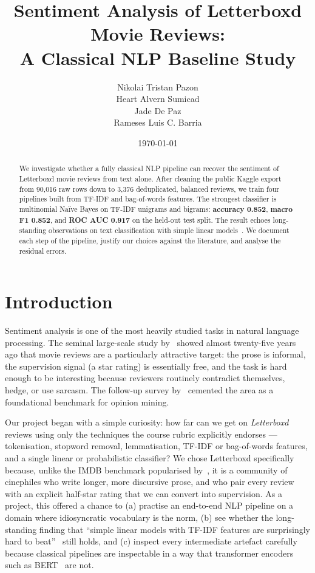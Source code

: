 \documentclass[11pt]{article}
\title{Sentiment Analysis of Letterboxd Movie Reviews:\\
A Classical NLP Baseline Study}
\author{Nikolai Tristan Pazon\\Heart Alvern Sumicad\\Jade De Paz\\Rameses Luis C. Barria}
\date{\today}
\begin{document}
\maketitle

\onehalfspacing

\begin{abstract}
\noindent We investigate whether a fully classical NLP pipeline can recover the sentiment of Letterboxd movie reviews from text alone. After cleaning the public Kaggle export from 90{,}016 raw rows down to 3{,}376 deduplicated, balanced reviews, we train four pipelines built from TF-IDF and bag-of-words features. The strongest classifier is multinomial Na\"ive Bayes on TF-IDF unigrams and bigrams: \textbf{accuracy 0.852}, \textbf{macro F1 0.852}, and \textbf{ROC AUC 0.917} on the held-out test split. The result echoes long-standing observations on text classification with simple linear models~\citep{joachims_1998, mccallum_nigam_1998, wang_manning_2012}. We document each step of the pipeline, justify our choices against the literature, and analyse the residual errors.
\end{abstract}

\section{Introduction}

Sentiment analysis is one of the most heavily studied tasks in natural language processing. The seminal large-scale study by~\citet{pang_lee_vaithyanathan_2002} showed almost twenty-five years ago that movie reviews are a particularly attractive target: the prose is informal, the supervision signal (a star rating) is essentially free, and the task is hard enough to be interesting because reviewers routinely contradict themselves, hedge, or use sarcasm. The follow-up survey by~\citet{pang_lee_2008} cemented the area as a foundational benchmark for opinion mining.

Our project began with a simple curiosity: how far can we get on \emph{Letterboxd} reviews using only the techniques the course rubric explicitly endorses --- tokenisation, stopword removal, lemmatisation, TF-IDF or bag-of-words features, and a single linear or probabilistic classifier? We chose Letterboxd specifically because, unlike the IMDB benchmark popularised by~\citet{maas_imdb_2011}, it is a community of cinephiles who write longer, more discursive prose, and who pair every review with an explicit half-star rating that we can convert into supervision. As a project, this offered a chance to (a) practise an end-to-end NLP pipeline on a domain where idiosyncratic vocabulary is the norm, (b) see whether the long-standing finding that ``simple linear models with TF-IDF features are surprisingly hard to beat''~\citep{wang_manning_2012} still holds, and (c) inspect every intermediate artefact carefully because classical pipelines are inspectable in a way that transformer encoders such as BERT~\citep{devlin_bert_2019} are not.
\end{document}
